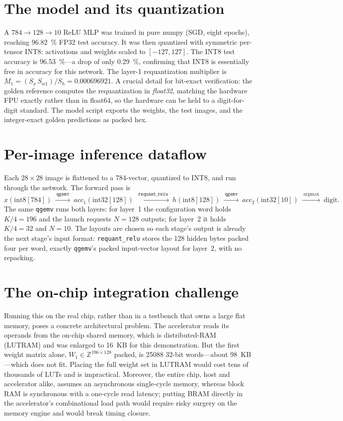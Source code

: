 \documentclass[12pt,a4paper,oneside]{report}
\newcommand{\code}[1]{\texttt{#1}}
\begin{document}
\section{The model and its quantization}
A $784{\rightarrow}128{\rightarrow}10$ ReLU MLP was trained in pure numpy (SGD,
eight epochs), reaching \SI{96.82}{\percent} FP32 test accuracy. It was then
quantized with symmetric per-tensor INT8: activations and weights scaled to
$[-127,127]$. The INT8 test accuracy is \SI{96.53}{\percent}---a drop of only
\SI{0.29}{\percent}, confirming that INT8 is essentially free in accuracy for this
network. The layer-1 requantization multiplier is
$M_1=(S_x\,S_{w1})/S_h=0.000696921$. A crucial detail for bit-exact verification:
the golden reference computes the requantization in \emph{float32}, matching the
hardware FPU exactly rather than in float64, so the hardware can be held to a
digit-for-digit standard. The model script exports the weights, the test images,
and the integer-exact golden predictions as packed hex.

\section{Per-image inference dataflow}
Each $28\times 28$ image is flattened to a 784-vector, quantized to INT8, and run
through the network. The forward pass is
\[
x(\mathrm{int8}[784])\ \xrightarrow{\ \code{qgemv}\ }\ \mathit{acc_1}(\mathrm{int32}[128])
\ \xrightarrow{\ \code{requant\_relu}\ }\ h(\mathrm{int8}[128])
\ \xrightarrow{\ \code{qgemv}\ }\ \mathit{acc_2}(\mathrm{int32}[10])
\ \xrightarrow{\ \mathrm{argmax}\ }\ \text{digit}.
\]
The same \code{qgemv} runs both layers: for layer~1 the configuration word holds
$K/4=196$ and the launch requests $N=128$ outputs; for layer~2 it holds $K/4=32$
and $N=10$. The layouts are chosen so each stage's output is already the next
stage's input format: \code{requant\_relu} stores the 128 hidden bytes packed four
per word, exactly \code{qgemv}'s packed input-vector layout for layer~2, with no
repacking.

\section{The on-chip integration challenge}
\label{sec:onchip}
Running this on the real chip, rather than in a testbench that owns a large flat
memory, poses a concrete architectural problem. The accelerator reads its operands
from the on-chip shared memory, which is distributed-RAM (LUTRAM) and was enlarged
to 16~KB for this demonstration. But the first weight matrix alone,
$W_1\in\mathbb{Z}^{196\times 128}$ packed, is \num{25088} 32-bit words---about
98~KB---which does not fit. Placing the full weight set in LUTRAM would cost tens of
thousands of LUTs and is impractical. Moreover, the entire chip, host and
accelerator alike, assumes an asynchronous single-cycle memory, whereas block RAM
is synchronous with a one-cycle read latency; putting BRAM directly in the
accelerator's combinational load path would require risky surgery on the memory
engine and would break timing closure.
\end{document}
